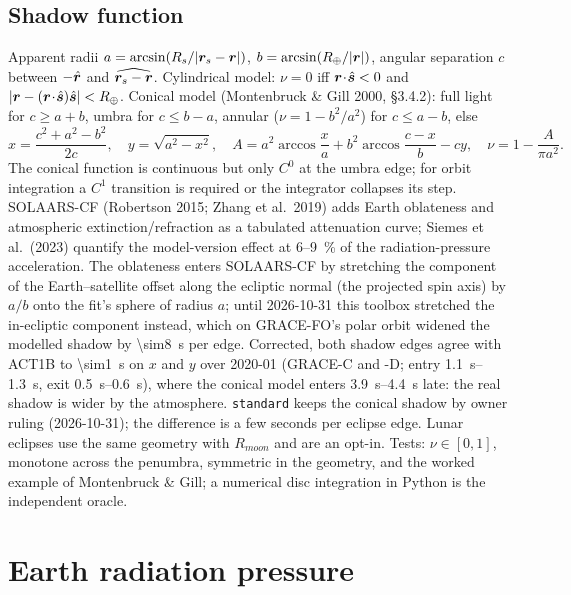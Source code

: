\subsection{Shadow function}
Apparent radii $a=\arcsin(R_s/|\bm{r}_s-\bm{r}|)$, $b=\arcsin(R_\oplus/|\bm{r}|)$, angular separation $c$ between $-\hat{\bm{r}}$ and $\widehat{\bm{r}_s-\bm{r}}$. Cylindrical model: $\nu=0$ iff $\bm{r}\!\cdot\!\hat{\bm{s}}<0$ and $|\bm{r}-(\bm{r}\!\cdot\!\hat{\bm{s}})\hat{\bm{s}}|<R_\oplus$. Conical model (Montenbruck \& Gill 2000, \S3.4.2): full light for $c\ge a+b$, umbra for $c\le b-a$, annular ($\nu=1-b^2/a^2$) for $c\le a-b$, else
\begin{equation}
x=\frac{c^2+a^2-b^2}{2c},\quad y=\sqrt{a^2-x^2},\quad
A=a^2\arccos\frac xa+b^2\arccos\frac{c-x}{b}-cy,\quad \nu=1-\frac{A}{\pi a^2}.
\end{equation}
The conical function is continuous but only $C^0$ at the umbra edge; for orbit integration a $C^1$ transition is required or the integrator collapses its step. SOLAARS-CF (Robertson 2015; Zhang et al.\ 2019) adds Earth oblateness and atmospheric extinction/refraction as a tabulated attenuation curve; Siemes et al.\ (2023) quantify the model-version effect at \SI{6}{}--\SI{9}{\percent} of the radiation-pressure acceleration. The oblateness enters SOLAARS-CF by stretching the component of the Earth--satellite offset along the ecliptic normal (the projected spin axis) by $a/b$ onto the fit's sphere of radius $a$; until 2026-10-31 this toolbox stretched the in-ecliptic component instead, which on GRACE-FO's polar orbit widened the modelled shadow by \SI{\sim8}{\second} per edge. Corrected, both shadow edges agree with ACT1B to \SI{\sim1}{\second} on $x$ and $y$ over 2020-01 (GRACE-C and -D; entry \SIrange{1.1}{1.3}{\second}, exit \SIrange{0.5}{0.6}{\second}), where the conical model enters \SIrange{3.9}{4.4}{\second} late: the real shadow is wider by the atmosphere. \texttt{standard} keeps the conical shadow by owner ruling (2026-10-31); the difference is a few seconds per eclipse edge. Lunar eclipses use the same geometry with $R_{moon}$ and are an opt-in. Tests: $\nu\in[0,1]$, monotone across the penumbra, symmetric in the geometry, and the worked example of Montenbruck \& Gill; a numerical disc integration in Python is the independent oracle.

\section{Earth radiation pressure}
